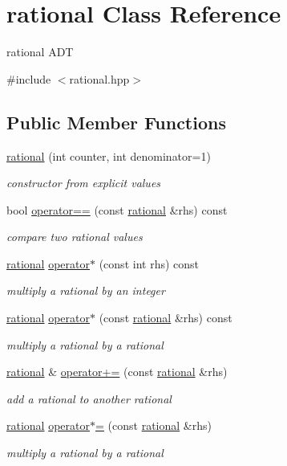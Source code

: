 \hypertarget{classrational}{}\section{rational Class Reference}
\label{classrational}


rational A\+DT  




{\ttfamily \#include $<$rational.\+hpp$>$}

\subsection*{Public Member Functions}
\begin{DoxyCompactItemize}
\item 
\hyperlink{classrational_a5f971ef33181044f54d8e4fee71cb957}{rational} (int counter, int denominator=1)
\begin{DoxyCompactList}\small\item\em constructor from explicit values \end{DoxyCompactList}\item 
bool \hyperlink{classrational_a5f9a93cc7fd6309f5eae4c76d81f28d5}{operator==} (const \hyperlink{classrational}{rational} \&rhs) const 
\begin{DoxyCompactList}\small\item\em compare two rational values \end{DoxyCompactList}\item 
\hyperlink{classrational}{rational} \hyperlink{classrational_acbaf4f76b2caf4aafb850202e29d69ce}{operator$\ast$} (const int rhs) const 
\begin{DoxyCompactList}\small\item\em multiply a rational by an integer \end{DoxyCompactList}\item 
\hyperlink{classrational}{rational} \hyperlink{classrational_a13f267e5cdafffcc44203762548bb5cd}{operator$\ast$} (const \hyperlink{classrational}{rational} \&rhs) const 
\begin{DoxyCompactList}\small\item\em multiply a rational by a rational \end{DoxyCompactList}\item 
\hyperlink{classrational}{rational} \& \hyperlink{classrational_a9b83ad0c803d2ac242b42e71d954a356}{operator+=} (const \hyperlink{classrational}{rational} \&rhs)
\begin{DoxyCompactList}\small\item\em add a rational to another rational \end{DoxyCompactList}\item 
\hyperlink{classrational}{rational} \hyperlink{classrational_a2b5729aef261d16cd18ff7c7fcbf8c6e}{operator$\ast$=} (const \hyperlink{classrational}{rational} \&rhs)
\begin{DoxyCompactList}\small\item\em multiply a rational by a rational \end{DoxyCompactList}\end{DoxyCompactItemize}
